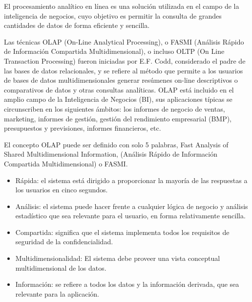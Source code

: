 \documentclass{fancyslides}
\begin{document}
\startingslide %

\begin{frame}
\end{frame}


\begin{frame}
\misc
{
  El procesamiento analítico en línea es una solución utilizada en el campo de la inteligencia de negocios, cuyo objetivo es permitir la consulta de grandes cantidades de datos de forma eficiente y sencilla.
}
\end{frame}

\begin{frame}
\misc
{Las técnicas OLAP (On-Line Analytical Processing), o FASMI (Análisis Rápido de Información Compartida Multidimensional), o incluso OLTP (On Line Transaction Processing) fueron iniciadas por E.F. Codd, considerado el padre de las bases de datos relacionales, y se refiere al método que permite a los usuarios de bases de datos multidimensionales generar resúmenes on-line descriptivos o comparativos de datos y otras consultas analíticas. OLAP está incluido en el amplio campo de la Inteligencia de Negocios (BI), sus aplicaciones típicas se circunscriben en los siguientes ámbitos: los informes de negocio de ventas, marketing, informes de gestión, gestión del rendimiento empresarial (BMP), presupuestos y previsiones, informes financieros, etc.
}
\end{frame}

\begin{frame}
\misc
{
El concepto OLAP puede ser definido con solo 5 palabras, Fast Analysis of Shared Multidimensional Information, (Análisis Rápido de Información Compartida Multidimensional)  o FASMI.
}
\end{frame}

\begin{frame}
\misc
{
\begin{itemize}
  \item Rápida: el sistema está dirigido a proporcionar la mayoría de las respuestas a los usuarios en cinco segundos.
  \item Análisis: el sistema puede hacer frente a cualquier lógica de negocio y análisis estadístico que sea relevante para el usuario, en forma relativamente sencilla.
  \item Compartida: significa que el sistema implementa todos los requisitos de seguridad de la confidencialidad.
  \item Multidimensionalidad: El sistema debe proveer una vista conceptual multidimensional de los datos.
  \item Información: se refiere a todos los datos y la información derivada, que sea relevante para la aplicación.
\end{itemize}
}
\end{frame}
\end{document}
